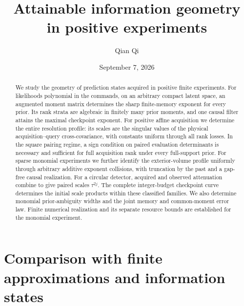 \documentclass[11pt]{amsart}
\title[Attainable information geometry]{Attainable information geometry\\ in positive experiments}
\author{Qian Qi}
\date{September 7, 2026}
\theoremstyle{definition}\newtheorem{definition}[theorem]{Definition}
\theoremstyle{remark}\newtheorem{remark}[theorem]{Remark}
\begin{document}
\begin{abstract}
We study the geometry of prediction states acquired in positive finite
experiments. For likelihoods polynomial in the commands, on an arbitrary
compact latent space, an augmented moment matrix determines the sharp
finite-memory exponent for every prior. Its rank strata are algebraic
in finitely many prior moments, and one causal filter attains the maximal
checkpoint exponent. For positive affine acquisition we determine the
entire resolution profile: its scales are the singular values of the
physical acquisition--query cross-covariance, with constants uniform
through all rank losses. In the square pairing regime, a sign condition
on paired evaluation determinants is necessary and sufficient for full
acquisition rank under every full-support prior. For sparse monomial
experiments we further identify the exterior-volume profile uniformly
through arbitrary additive exponent collisions, with truncation by the
past and a gap-free causal realization. For a circular detector, acquired
and observed attenuation combine to give paired scales $\tau^{2j}$.
The complete integer-budget checkpoint curve determines the initial
scale products within these classified families. We also determine
monomial prior-ambiguity widths and the joint memory and common-moment
error law. Finite numerical realization and its separate resource bounds
are established for the monomial experiment.
\end{abstract}
\maketitle
















\appendix












\section{Comparison with finite approximations and information states}
\label{sec:literature-comparison}



\end{document}
